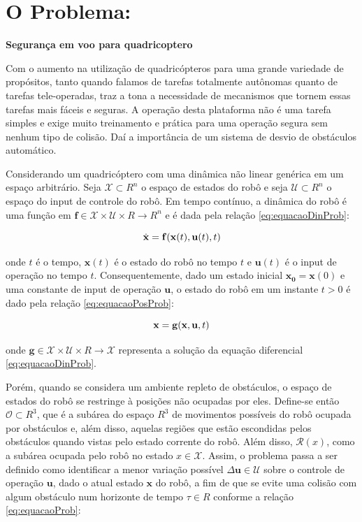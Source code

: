 \documentclass[a4paper, 12pt]{article}
\begin{document}
\newpage

\section{O Problema:}
\label{sec:prob}
\noindent\textbf{Segurança em voo para quadricoptero}

Com o aumento na utilização de quadricópteros para uma grande variedade de propósitos, tanto quando falamos de tarefas totalmente autônomas quanto de tarefas tele-operadas, traz a tona a necessidade de mecanismos que tornem essas tarefas mais fáceis e seguras. A operação desta plataforma não é uma tarefa simples e exige muito treinamento e prática para uma operação segura sem nenhum tipo de colisão. Daí a importância de um sistema de desvio de obstáculos automático. 

Considerando um quadricóptero com uma dinâmica não linear genérica em um espaço arbitrário. Seja $\mathcal{X} \subset R^{n}$ o espaço de estados do robô e seja $\mathcal{U} \subset R^{n}$ o espaço do input de controle do robô. Em tempo contínuo, a dinâmica do robô é uma função em $\mathbf{f} \in \mathcal{X} \times \mathcal{U} \times R \rightarrow R^{n}$ e é dada pela relação \ref{eq:equacaoDinProb}:

\begin{equation}
\centering
\dot{\mathbf{x}} = \mathbf{f}(\mathbf{x}(t),\mathbf{u}(t),t)  
\label{eq:equacaoDinProb}
\end{equation}

\noindent onde $t$ é o tempo, $\mathbf{x}(t)$ é o estado do robô no tempo $t$ e $\mathbf{u}(t)$ é o input de operação no tempo $t$. Consequentemente, dado um estado inicial $\mathbf{x_0} = \mathbf{x}(0)$ e uma constante de input de operação $\mathbf{u}$, o estado do robô em um instante $t > 0$ é dado pela relação \ref{eq:equacaoPosProb}:
 

\begin{equation}
\centering
\mathbf{x} = \mathbf{g}(\mathbf{x},\mathbf{u},t)  
\label{eq:equacaoPosProb}
\end{equation}

\noindent onde $\mathbf{g} \in \mathcal{X} \times \mathcal{U} \times R \rightarrow \mathcal{X}$ representa a solução da equação diferencial \ref{eq:equacaoDinProb}.

Porém, quando se considera um ambiente repleto de obstáculos, o espaço de estados do robô se restringe à posições não ocupadas por eles. Define-se então $\mathcal{O} \subset R^3$, que é a subárea do espaço $R^3$ de movimentos possíveis do robô ocupada por obstáculos e, além disso, aquelas regiões que estão escondidas pelos obstáculos quando vistas pelo estado corrente do robô. Além disso, $\mathcal{R}(x)$, como a subárea ocupada pelo robô no estado $x \in \mathcal{X}$. Assim, o problema passa a ser definido como identificar a menor variação possível  $\Delta\mathbf{u} \in \mathcal{U}$ sobre o controle de operação $\mathbf{u}$, dado o atual estado $\mathbf{x}$ do robô, a fim de que se evite uma colisão com algum obstáculo num horizonte de tempo $\tau \in R$ conforme a relação \ref{eq:equacaoProb}:
\end{document}

